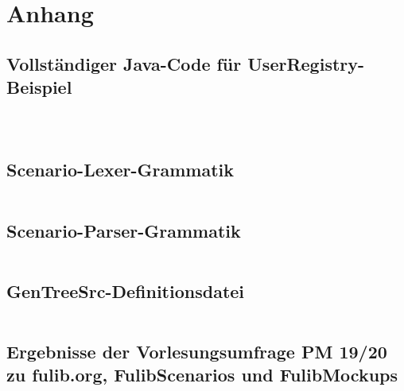\chapter{Anhang}\label{ch:appendix}

\section{Vollständiger Java-Code für UserRegistry-Beispiel}\label{sec:user-registry-full}

\begin{center}
    \inputminted[breaklines]{java}{chapter/fulib-scenarios/java/User.java}

    \inputminted[breaklines]{java}{chapter/fulib-scenarios/java/UserRegistry.java}

    \inputminted[breaklines]{java}{chapter/fulib-scenarios/java/UserRegistryTest.java}
\end{center}

\section{Scenario-Lexer-Grammatik}\label{sec:scenario-lexer-grammar}

\inputminted[breaklines]{antlr}{chapter/fulib-scenarios/grammars/ScenarioLexer.g4}

\section{Scenario-Parser-Grammatik}\label{sec:scenario-parser-grammar}

\inputminted[breaklines]{antlr}{chapter/fulib-scenarios/grammars/ScenarioParser.g4}

\section{GenTreeSrc-Definitionsdatei}\label{sec:gts-definitions}

\inputminted[breaklines]{java}{chapter/fulib-scenarios/definitions/FulibScenarios.gts}

\section{Ergebnisse der Vorlesungsumfrage PM 19/20 zu fulib.org, FulibScenarios und FulibMockups}\label{sec:survey-results}

